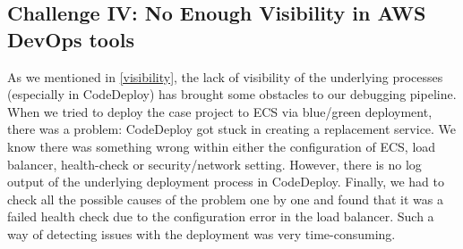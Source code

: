 \subsection{Challenge IV: No Enough Visibility in AWS DevOps tools}
As we mentioned in \ref{visibility}, the lack of visibility of the underlying processes (especially in CodeDeploy) has brought some obstacles to our debugging pipeline. When we tried to deploy the case project to ECS via blue/green deployment, there was a problem: CodeDeploy got stuck in creating a replacement service. We know there was something wrong within either the configuration of ECS, load balancer, health-check or security/network setting. However, there is no log output of the underlying deployment process in CodeDeploy. Finally, we had to check all the possible causes of the problem one by one and found that it was a failed health check due to the configuration error in the load balancer. Such a way of detecting issues with the deployment was very time-consuming.
